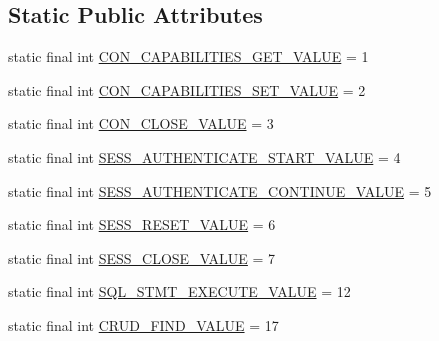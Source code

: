 \subsection*{Static Public Attributes}
\begin{DoxyCompactItemize}
\item 
static final int \mbox{\hyperlink{enumcom_1_1mysql_1_1cj_1_1x_1_1protobuf_1_1_mysqlx_1_1_client_messages_1_1_type_a65d83796853cb22be1be43a0131c5dd1}{C\+O\+N\+\_\+\+C\+A\+P\+A\+B\+I\+L\+I\+T\+I\+E\+S\+\_\+\+G\+E\+T\+\_\+\+V\+A\+L\+UE}} = 1
\item 
static final int \mbox{\hyperlink{enumcom_1_1mysql_1_1cj_1_1x_1_1protobuf_1_1_mysqlx_1_1_client_messages_1_1_type_af9f583406c3b979546757081af2fbf30}{C\+O\+N\+\_\+\+C\+A\+P\+A\+B\+I\+L\+I\+T\+I\+E\+S\+\_\+\+S\+E\+T\+\_\+\+V\+A\+L\+UE}} = 2
\item 
static final int \mbox{\hyperlink{enumcom_1_1mysql_1_1cj_1_1x_1_1protobuf_1_1_mysqlx_1_1_client_messages_1_1_type_a913d32080718eddbd0dd76fa08c66871}{C\+O\+N\+\_\+\+C\+L\+O\+S\+E\+\_\+\+V\+A\+L\+UE}} = 3
\item 
static final int \mbox{\hyperlink{enumcom_1_1mysql_1_1cj_1_1x_1_1protobuf_1_1_mysqlx_1_1_client_messages_1_1_type_a6f751d9b08ecf41808a50bb5db347ba4}{S\+E\+S\+S\+\_\+\+A\+U\+T\+H\+E\+N\+T\+I\+C\+A\+T\+E\+\_\+\+S\+T\+A\+R\+T\+\_\+\+V\+A\+L\+UE}} = 4
\item 
static final int \mbox{\hyperlink{enumcom_1_1mysql_1_1cj_1_1x_1_1protobuf_1_1_mysqlx_1_1_client_messages_1_1_type_a8d67954014a164bbe1c6aacca7eba347}{S\+E\+S\+S\+\_\+\+A\+U\+T\+H\+E\+N\+T\+I\+C\+A\+T\+E\+\_\+\+C\+O\+N\+T\+I\+N\+U\+E\+\_\+\+V\+A\+L\+UE}} = 5
\item 
static final int \mbox{\hyperlink{enumcom_1_1mysql_1_1cj_1_1x_1_1protobuf_1_1_mysqlx_1_1_client_messages_1_1_type_ade71b2e3873244a99a2e0730b89bcfee}{S\+E\+S\+S\+\_\+\+R\+E\+S\+E\+T\+\_\+\+V\+A\+L\+UE}} = 6
\item 
static final int \mbox{\hyperlink{enumcom_1_1mysql_1_1cj_1_1x_1_1protobuf_1_1_mysqlx_1_1_client_messages_1_1_type_abf7a00de00878421c68175f32cd79720}{S\+E\+S\+S\+\_\+\+C\+L\+O\+S\+E\+\_\+\+V\+A\+L\+UE}} = 7
\item 
static final int \mbox{\hyperlink{enumcom_1_1mysql_1_1cj_1_1x_1_1protobuf_1_1_mysqlx_1_1_client_messages_1_1_type_adf0f59e65c29be617b78ca79d8cc9612}{S\+Q\+L\+\_\+\+S\+T\+M\+T\+\_\+\+E\+X\+E\+C\+U\+T\+E\+\_\+\+V\+A\+L\+UE}} = 12
\item 
static final int \mbox{\hyperlink{enumcom_1_1mysql_1_1cj_1_1x_1_1protobuf_1_1_mysqlx_1_1_client_messages_1_1_type_a369000b4e125b8c616f4e39df8f830e0}{C\+R\+U\+D\+\_\+\+F\+I\+N\+D\+\_\+\+V\+A\+L\+UE}} = 17

\end{DoxyCompactItemize}
